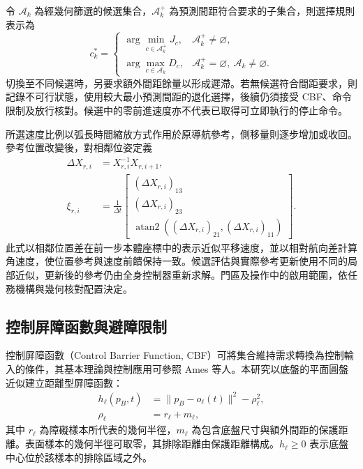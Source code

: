 令 $\mathcal A_k$ 為經幾何篩選的候選集合，$\mathcal A_k^{+}$ 為預測間距符合要求的子集合，則選擇規則表示為
\begin{equation}
    c_k^{*}=
    \begin{cases}
        \displaystyle\arg\min_{c\in\mathcal A_k^{+}}J_c,
          &\mathcal A_k^{+}\ne\varnothing,\\[1mm]
        \displaystyle\arg\max_{c\in\mathcal A_k}D_c,
          &\mathcal A_k^{+}=\varnothing,\
           \mathcal A_k\ne\varnothing.
    \end{cases}
    \label{eq:ch3_candidate_selection_rule}
\end{equation}
切換至不同候選時，另要求額外間距餘量以形成遲滯。若無候選符合間距要求，則記錄不可行狀態，使用較大最小預測間距的退化選擇，後續仍須接受 CBF、命令限制及放行核對。候選中的零前進速度亦不代表已取得可立即執行的停止命令。

所選速度比例以弧長時間縮放方式作用於原導航參考，側移量則逐步增加或收回。參考位置改變後，對相鄰位姿定義
\begin{equation}
    \begin{aligned}
        \Delta X_{r,i}
        &=X_{r,i}^{-1}X_{r,i+1},\\
        \xi_{r,i}
        &=\frac{1}{\Delta t}
          \begin{bmatrix}
            (\Delta X_{r,i})_{13}\\
            (\Delta X_{r,i})_{23}\\
            \operatorname{atan2}
              ((\Delta X_{r,i})_{21},(\Delta X_{r,i})_{11})
          \end{bmatrix}.
    \end{aligned}
    \label{eq:ch3_reference_velocity_reconstruction}
\end{equation}
此式以相鄰位置差在前一步本體座標中的表示近似平移速度，並以相對航向差計算角速度，使位置參考與速度前饋保持一致。候選評估與實際參考更新使用不同的局部近似，更新後的參考仍由全身控制器重新求解。門區及操作中的啟用範圍，依任務機構與幾何核對配置決定。

\subsection{控制屏障函數與避障限制}
\label{subsec:cbf_obstacle_constraints}

控制屏障函數（Control Barrier Function, CBF）可將集合維持需求轉換為控制輸入的條件，其基本理論與控制應用可參照 Ames 等人\cite{ames2019cbf}。本研究以底盤的平面圓盤近似建立距離型屏障函數：
\begin{equation}
    \begin{aligned}
        h_{\ell}(p_B,t)
        &=\|p_B-o_{\ell}(t)\|^2-\rho_{\ell}^{2}, \\
        \rho_{\ell}
        &=r_{\ell}+m_{\ell},
    \end{aligned}
    \label{eq:ch3_obstacle_barrier_function}
\end{equation}
其中 $r_{\ell}$ 為障礙樣本所代表的幾何半徑，$m_{\ell}$ 為包含底盤尺寸與額外間距的保護距離。表面樣本的幾何半徑可取零，其排除距離由保護距離構成。$h_{\ell}\geq0$ 表示底盤中心位於該樣本的排除區域之外。

